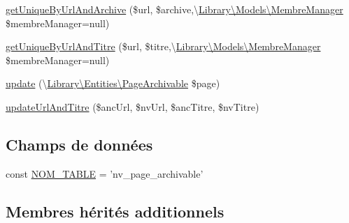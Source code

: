 \begin{DoxyCompactItemize}
\item 
\hyperlink{class_library_1_1_models_1_1_page_archivable_manager___p_d_o_a55b74423b698952d1a0192a6ea7aa1d1}{get\+Unique\+By\+Url\+And\+Archive} (\$url, \$archive,\textbackslash{}\hyperlink{class_library_1_1_models_1_1_membre_manager}{Library\textbackslash{}\+Models\textbackslash{}\+Membre\+Manager} \$membre\+Manager=null)
\item 
\hyperlink{class_library_1_1_models_1_1_page_archivable_manager___p_d_o_a968054a64e44b15546a87f57a5c5ba03}{get\+Unique\+By\+Url\+And\+Titre} (\$url, \$titre,\textbackslash{}\hyperlink{class_library_1_1_models_1_1_membre_manager}{Library\textbackslash{}\+Models\textbackslash{}\+Membre\+Manager} \$membre\+Manager=null)
\item 
\hyperlink{class_library_1_1_models_1_1_page_archivable_manager___p_d_o_a48f21ab940066848db8a223f032c78fd}{update} (\textbackslash{}\hyperlink{class_library_1_1_entities_1_1_page_archivable}{Library\textbackslash{}\+Entities\textbackslash{}\+Page\+Archivable} \$page)
\item 
\hyperlink{class_library_1_1_models_1_1_page_archivable_manager___p_d_o_a3dbc86813da702124a4d5d02154f3b52}{update\+Url\+And\+Titre} (\$anc\+Url, \$nv\+Url, \$anc\+Titre, \$nv\+Titre)
\end{DoxyCompactItemize}
\subsection*{Champs de données}
\begin{DoxyCompactItemize}
\item 
const \hyperlink{class_library_1_1_models_1_1_page_archivable_manager___p_d_o_a243755033f10b0817aa9d990cc252817}{N\+O\+M\+\_\+\+T\+A\+B\+L\+E} = 'nv\+\_\+page\+\_\+archivable'
\end{DoxyCompactItemize}
\subsection*{Membres hérités additionnels}


